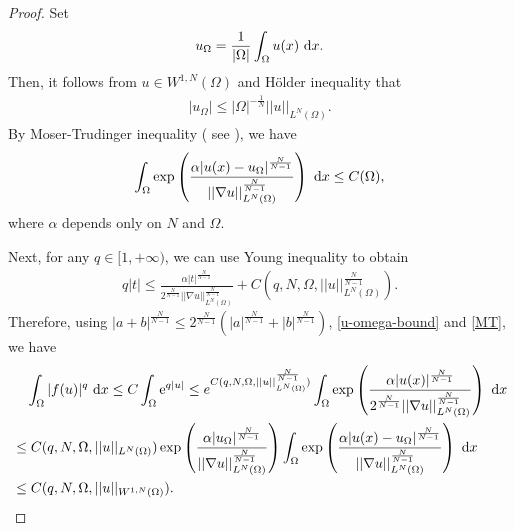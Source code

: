 \documentclass[reqno, 11pt]{amsart} %
\numberwithin{equation}{section}
\theoremstyle{definition}
\newcommand{\pa}{\partial}
\newcommand{\R}{\mathbb{R}}
\newcommand{\e}{\textup{e}}
\newcommand{\dx}{\textup{d}x}
\begin{document}
\begin{proof}
    Set
    \begin{align*}
        u_{\Omega} = \frac{1}{|\Omega|} \int_{\Omega} u(x) \ \dx. %
    \end{align*}
    Then, it follows from $u \in W^{1,N}(\Omega)$ and  H\"{o}lder inequality that
    \begin{align}\label{u-omega-bound}
        |u_{\Omega}| \leq |\Omega|^{-\frac{1}{N}}||u||_{L^N(\Omega)}. %
    \end{align}
    By  Moser-Trudinger inequality ( see \cite{C2008}),  we have
    \begin{align}\label{MT}
        \int_{\Omega} \exp\left(\frac{\alpha |u(x) - u_{\Omega}|^{\frac{N}{N-1}}}{||\nabla u||_{L^N(\Omega)}^{\frac{N}{N-1}}} \right)  \ \dx \leq C(\Omega) ,%
    \end{align}
    where $\alpha$  depends only on $N$ and $\Omega$. 
    
    Next, for any $q \in [1,+\infty)$, we can use Young inequality to obtain
    \begin{align*}
        q|t| \leq  \frac{\alpha|t|^{\frac{N}{N-1}}}{2^{\frac{N}{N-1}}||\nabla u ||_{L^{N}(\Omega)}^{\frac{N}{N-1}}} + C(q, N , \Omega, ||u||_{L^{N}(\Omega)}^{\frac{N}{N-1}}).
    \end{align*}
    Therefore, using $|a+b|^{\frac{N}{N-1}} \leq 2^{\frac{N}{N-1}}(|a|^{\frac{N}{N-1}} + |b|^{\frac{N}{N-1}})$, \eqref{u-omega-bound} and \eqref{MT}, we have
    \begin{align}\label{f-Lq}
       &\quad \int_{\Omega}  |f(u)|^q \ \dx \leq C\int_{\Omega} \e^{q|u|}   \leq e^{C(q,N, \Omega, ||u||_{L^{N}(\Omega)}^{\frac{N}{N-1}})} \int_{\Omega} \exp\left( \frac{\alpha|u(x)|^{\frac{N}{N-1}}}{2^{\frac{N}{N-1}}||\nabla u ||_{L^{N}(\Omega)}^{\frac{N}{N-1}}} \right) \ \dx \nonumber\\
        & \leq C(q,N, \Omega, ||u||_{L^N(\Omega)})\exp\left( \frac{\alpha|u_{\Omega}|^{\frac{N}{N-1}}}{||\nabla u ||_{L^{N}(\Omega)}^{\frac{N}{N-1}}} \right)\int_{\Omega} \exp\left( \frac{\alpha|u(x) - u_{\Omega}|^{\frac{N}{N-1}}}{||\nabla u ||_{L^{N}(\Omega)}^{\frac{N}{N-1}}} \right) \ \dx \nonumber\\
         & \leq C(q,N, \Omega, ||u||_{W^{1,N}(\Omega)}).
    \end{align}


\end{proof}
\end{document}
